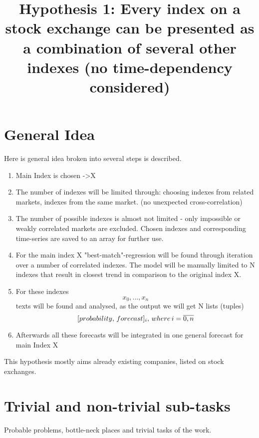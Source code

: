 \documentclass[16pt]{article}
\title{Hypothesis 1: Every index on a stock exchange can be presented as a combination of several other indexes (no time-dependency considered)}
\begin{document}
\maketitle
\section{General Idea}
Here is general idea broken into several steps is described.

\begin{enumerate}
	\item Main Index is chosen -\textgreater X
	\item The number of indexes will be limited through: choosing indexes from related markets, indexes from the same market. (no unexpected cross-correlation)
	\item The number of possible indexes is almost not limited - only impossible or weakly correlated markets are excluded. Chosen indexes and corresponding time-series are saved to an array for further use.
	\item For the main index X "best-match"-regression will be found through iteration over a number of correlated indexes. The model will be manually limited to N indexes that result in closest trend in comparison to the original index X.    
	\item For these indexes \[x_{0},...,x_{n}\] texts will be found and analysed, as the output we will get N lists (tuples) \[[probability,\thinspace forecast]_{i}, \thinspace where \thinspace i=\overline{0,n}\] 
	\item Afterwards all these forecasts will be integrated in one general forecast for main Index X
\end{enumerate}
This hypothesis mostly aims already existing companies, listed on stock exchanges.  


\newpage
\section{Trivial and non-trivial sub-tasks}
Probable problems, bottle-neck places and trivial tasks of the work.
\end{document}
